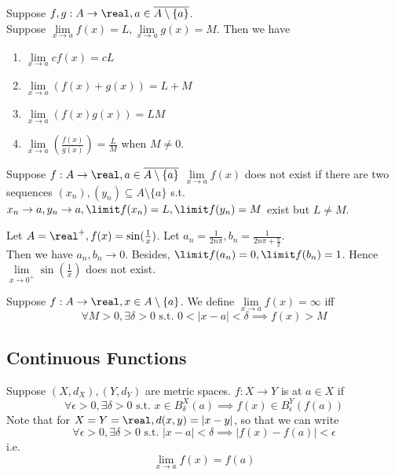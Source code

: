 \documentclass[11pt]{article}
\begin{document}
Suppose $f, g: A \rightarrow \real, a \in \overline{A \setminus \{a\}}$.\\
Suppose $\underset{x \rightarrow a}{\lim} f(x) = L, \underset{x \rightarrow a}{\lim} g(x) = M$. Then we have
\begin{enumerate}
	\item $\underset{x \rightarrow a}{\lim} cf(x) = cL$
	\item $\underset{x \rightarrow a}{\lim} (f(x) + g(x)) = L + M$
	\item $\underset{x \rightarrow a}{\lim} (f(x)g(x)) = LM$
	\item $\underset{x \rightarrow a}{\lim} (\frac{f(x)}{g(x)}) = \frac{L}{M}$ when $M \neq 0$.
\end{enumerate}

 Suppose $f: A \rightarrow \real, a \in \overline{A \setminus \{a\}}$ $\underset{x \rightarrow a}{\lim} f(x)$ does not exist if there are two sequences $(x_n), (y_n) \subseteq A \setminus \{a\}$ s.t. $x_n \rightarrow a, y_n \rightarrow a, \limit f(x_n) = L, \limit f(y_n) = M$ exist but $L \neq M$.

\example
Let $A = \real^+, f(x) = \sin(\frac{1}{x})$. Let $a_n = \frac{1}{2n\pi}, b_n = \frac{1}{2n\pi + \frac{\pi}{2}}$. \\
Then we have $a_n, b_n \rightarrow 0$. Besides, $\limit f(a_n) = 0, \limit f(b_n) = 1$. Hence $\underset{x \rightarrow 0^+}{\lim} \sin(\frac{1}{x})$ does not exist.

Suppose $f: A \rightarrow \real, x \in A \setminus \{a\}$. We define $\underset{x \rightarrow a}{\lim} f(x) = \infty$ iff
$$\forall M > 0, \exists \delta > 0 \text{ s.t. } 0 < |x - a| < \delta \implies f(x) > M$$


\subsection{Continuous Functions}
 Suppose $(X, d_X), (Y, d_Y)$ are metric spaces. $f: X \rightarrow Y$ is  at $a \in X$ if 
 $$\forall \epsilon > 0, \exists \delta > 0 \text{ s.t. } x \in B_{\delta}^X(a) \implies f(x) \in B_{\epsilon}^Y(f(a))$$
 \remark
 Note that for $X = Y = \real, d(x,y) = |x - y|$, so that we can write
 $$\forall \epsilon > 0, \exists \delta > 0 \text{ s.t. } |x - a| < \delta \implies |f(x) - f(a)| < \epsilon$$
 i.e. $$\underset{x \rightarrow a}{\lim} f(x) = f(a)$$
\end{document}
